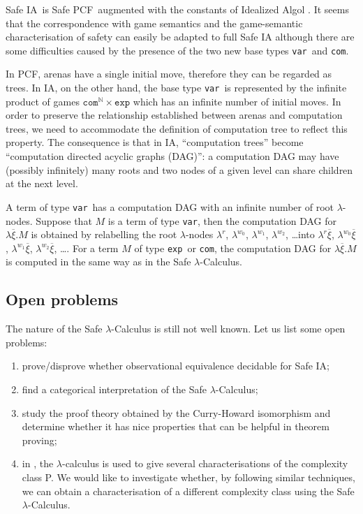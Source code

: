 \documentclass{llncs}
\newcommand\nat{\mathbb{N}}
\newcommand\ialgol{\textsf{IA}}
\newcommand\iacom{\texttt{com}}
\newcommand\iaexp{\texttt{exp}}
\newcommand\iavar{\texttt{var}}
\newcommand\pcf{\textsf{PCF}}
\begin{document}
Safe \ialgol\ is Safe \pcf\ augmented with the constants of Idealized Algol
\cite{Reynolds81}. It seems that the correspondence with game semantics and the game-semantic characterisation
of safety can easily be adapted to full Safe \textsf{IA}
although there are some difficulties caused by the presence of the two new
base types \iavar\ and \iacom.

In \pcf, arenas have a single initial move, therefore they can be
regarded as trees. In \ialgol, on the other hand, the base type
\iavar\ is represented by the infinite product of games
$\iacom^{\nat} \times \iaexp$ which has an infinite number of
initial moves. In order to preserve the relationship established
between arenas and computation trees, we need to accommodate the
definition of computation tree to reflect this property. The
consequence is that in \ialgol, ``computation trees'' become
``computation directed acyclic graphs (DAG)'': a computation DAG may
have (possibly infinitely) many roots and two nodes of a given level
can share children at the next level.

A term of type \iavar\ has a computation DAG with an infinite number
of root $\lambda$-nodes. Suppose that $M$ is a term of type \iavar,
then the computation DAG for $\lambda \overline{\xi} . M$ is
obtained by relabelling the root $\lambda$-nodes $\lambda^r$,
$\lambda^{w_0}$, $\lambda^{w_1}$, $\lambda^{w_2}$, \ldots into
$\lambda^r \overline{\xi}$, $\lambda^{w_0} \overline{\xi}$,
$\lambda^{w_1} \overline{\xi}$, $\lambda^{w_2} \overline{\xi}$,
\ldots. For a term $M$  of type \iaexp\ or \iacom, the computation
DAG for $\lambda \overline{\xi} . M$ is computed in the same way as
in the Safe $\lambda$-Calculus.



\subsection{Open problems}

The nature of the Safe $\lambda$-Calculus is still not well known. Let us list some open problems:
\begin{enumerate}
\item prove/disprove whether observational equivalence decidable for Safe \ialgol;
\item find a categorical interpretation of the Safe $\lambda$-Calculus;
\item study the proof theory obtained by the Curry-Howard isomorphism and determine whether it has nice properties that can be helpful in theorem proving;
\item in \cite{DBLP:conf/tlca/LeivantM93}, the $\lambda$-calculus is used to
give several characterisations of the complexity class P. We would
like to investigate whether, by following similar techniques, we can
obtain a characterisation of a different complexity class using the
Safe $\lambda$-Calculus.
\end{enumerate}
\end{document}
